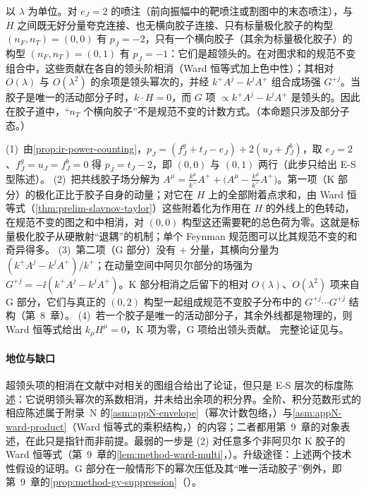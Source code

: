 \begin{proposition}\label{prop:ir-super-leading}
以 $\lambda$ 为单位。对 $e_J=2$ 的喷注（前向振幅中的靶喷注或割图中的末态喷注），与 $H$ 之间既无好分量夸克连接、也无横向胶子连接、只有标量极化胶子的构型 $(n_F,n_T)=(0,0)$ 有 $p_J=-2$，只有一个横向胶子（其余为标量极化胶子）的构型 $(n_F,n_T)=(0,1)$ 有 $p_J=-1$：它们是超领头的。在对图求和的规范不变组合中，这些贡献在各自的领头阶相消（Ward 恒等式加上色中性）；其相对 $O(\lambda)$ 与 $O(\lambda^2)$ 的余项是领头幂次的，并经 $k^+A^j-k^jA^+$ 组合成场强 $G^{+j}$。当胶子是唯一的活动部分子时，$k\cdot H=0$，而 $G$ 项 $\propto k^+A^j-k^jA^+$ 是领头的。因此在胶子道中，“$n_T$ 个横向胶子”不是规范不变的计数方式。（本命题只涉及部分子态。）
\end{proposition}
\begin{proofsketch}
(1)~由\cref{prop:ir-power-counting}，$p_J=(f^g_J+t_J-e_J)+2(u_J+f^b_J)$，取 $e_J=2$、$f^g_J=u_J=f^b_J=0$ 得 $p_J=t_J-2$，即 $(0,0)$ 与 $(0,1)$ 两行（此步只给出 E-S 型陈述）。
(2)~把共线胶子场分解为 $A^\mu=\frac{k^\mu}{k^+}A^++\big(A^\mu-\frac{k^\mu}{k^+}A^+\big)$。第一项（K 部分）的极化正比于胶子自身的动量；对它在 $H$ 上的全部附着点求和，由 Ward 恒等式（\cref{thm:prelim-slavnov-taylor}）这些附着化为作用在 $H$ 的外线上的色转动，在规范不变的图之和中相消，对 $(0,0)$ 构型这还需要靶的总色荷为零。这就是标量极化胶子从硬散射“退耦”的机制\cite[第~2.4~节]{Sterman:1995fz}；单个 Feynman 规范图可以比其规范不变的和奇异得多\cite[第~8.6~节]{CollinsSoperSterman1989}。
(3)~第二项（G 部分）没有 $+$ 分量，其横向分量为 $(k^+A^j-k^jA^+)/k^+$；在动量空间中阿贝尔部分的场强为 $G^{+j}=-\ii(k^+A^j-k^jA^+)$。K 部分相消之后留下的相对 $O(\lambda)$、$O(\lambda^2)$ 项来自 G 部分，它们与真正的 $(0,2)$ 构型一起组成规范不变胶子分布中的 $G^{+j}\cdots G^{+j}$ 结构（第~8~章）。
(4)~若一个胶子是唯一的活动部分子，其余外线都是物理的，则 Ward 恒等式给出 $k_\mu H^\mu=0$，K 项为零，G 项给出领头贡献。
完整论证见\cite[第~8.6~节]{CollinsSoperSterman1989}与\cite[第~5.9~节]{Collins2011}。
\end{proofsketch}

\paragraph{地位与缺口}
超领头项的相消在文献中对相关的图组合给出了论证，但只是 E-S 层次的标度陈述：它说明领头幂次的系数相消，并未给出余项的积分界。全阶、积分范数形式的相应陈述属于附录~N 的\cref{asm:appN-envelope}（幂次计数包络，\tagA）与\cref{asm:appN-ward-product}（Ward 恒等式的乘积结构，\tagA）的内容；二者都用第~9~章的对象表述，在此只是指针而非前提。最弱的一步是 (2) 对任意多个非阿贝尔 K 胶子的 Ward 恒等式（第~9~章的\cref{lem:method-ward-multi}，\tagA）。升级途径：上述两个技术性假设的证明。G 部分在一般情形下的幂次压低及其“唯一活动胶子”例外，即第~9~章的\cref{prop:method-gy-suppression}（\tagA）。

